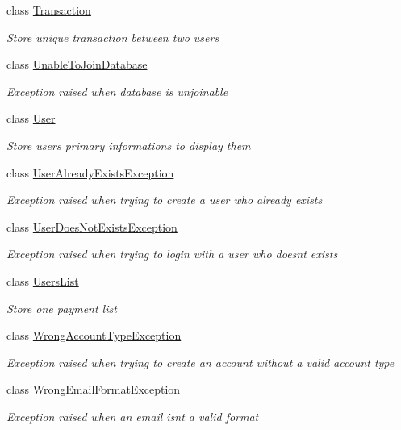 \begin{DoxyCompactItemize}
class \mbox{\hyperlink{class_projet_banque_1_1_transaction}{Transaction}}
\begin{DoxyCompactList}\small\item\em Store unique transaction between two users \end{DoxyCompactList}\item 
class \mbox{\hyperlink{class_projet_banque_1_1_unable_to_join_database}{Unable\+To\+Join\+Database}}
\begin{DoxyCompactList}\small\item\em Exception raised when database is unjoinable \end{DoxyCompactList}\item 
class \mbox{\hyperlink{class_projet_banque_1_1_user}{User}}
\begin{DoxyCompactList}\small\item\em Store user\textquotesingle{}s primary informations to display them \end{DoxyCompactList}\item 
class \mbox{\hyperlink{class_projet_banque_1_1_user_already_exists_exception}{User\+Already\+Exists\+Exception}}
\begin{DoxyCompactList}\small\item\em Exception raised when trying to create a user who already exists \end{DoxyCompactList}\item 
class \mbox{\hyperlink{class_projet_banque_1_1_user_does_not_exists_exception}{User\+Does\+Not\+Exists\+Exception}}
\begin{DoxyCompactList}\small\item\em Exception raised when trying to login with a user who doesn\textquotesingle{}t exists \end{DoxyCompactList}\item 
class \mbox{\hyperlink{class_projet_banque_1_1_users_list}{Users\+List}}
\begin{DoxyCompactList}\small\item\em Store one payment list \end{DoxyCompactList}\item 
class \mbox{\hyperlink{class_projet_banque_1_1_wrong_account_type_exception}{Wrong\+Account\+Type\+Exception}}
\begin{DoxyCompactList}\small\item\em Exception raised when trying to create an account without a valid account type \end{DoxyCompactList}\item 
class \mbox{\hyperlink{class_projet_banque_1_1_wrong_email_format_exception}{Wrong\+Email\+Format\+Exception}}
\begin{DoxyCompactList}\small\item\em Exception raised when an email isn\textquotesingle{}t a valid format \end{DoxyCompactList}\end{DoxyCompactItemize}
